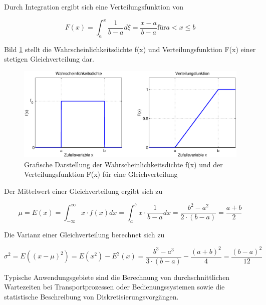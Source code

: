 \noindent Durch Integration ergibt sich eine Verteilungsfunktion von 

\begin{equation}\label{eq:fourhundredsixtysix}
F(x)=\int _{a}^{x}\dfrac{1}{b-a} d\xi  =\dfrac{x-a}{b-a} \text{für} a < x \le b
\end{equation}

\noindent Bild \ref{fig:Stetig_Gleichverteilung} stellt die Wahrscheinlichkeitsdichte f(x) und Verteilungsfunktion F(x) einer stetigen Gleichverteilung dar.

\begin{figure}[H]
  \centerline{\includegraphics[width=1\textwidth]{Kapitel4/Bilder/image22}}
  \caption{Grafische Darstellung der Wahrscheinlichkeitsdichte f(x) und der Verteilungsfunktion F(x) f\"{u}r eine Gleichverteilung}
  \label{fig:Stetig_Gleichverteilung}
\end{figure}

\noindent Der Mittelwert einer Gleichverteilung ergibt sich zu

\begin{equation}\label{eq:fourhundredsixtyseven}
\mu =E(x)=\int _{-\infty}^{\infty}x\cdot f(x) dx=\int _{a}^{b}x\cdot \dfrac{1}{b-a} dx=\dfrac{b^{2} -a^{2} }{2\cdot (b-a)} =\dfrac{a+b}{2}
\end{equation}

\clearpage 

\noindent Die Varianz einer Gleichverteilung berechnet sich zu

\begin{equation}\label{eq:fourhundredsixtyeight}
\sigma _{}^{2} =E\left((x-\mu)^{2} \right)=E\left(x^{2} \right)-E^{2} \left(x\right)=\dfrac{b^{3} -a^{3} }{3\cdot \left(b-a\right)} -\dfrac{(a+b)^{2} }{4} =\dfrac{(b-a)^{2} }{12}
\end{equation}

\noindent Typische Anwendungsgebiete sind die Berechnung von durchschnittlichen Wartezeiten bei Transportprozessen oder Bedienungssystemen sowie die statistische Beschreibung von Diskretisierungsvorg\"{a}ngen. 

